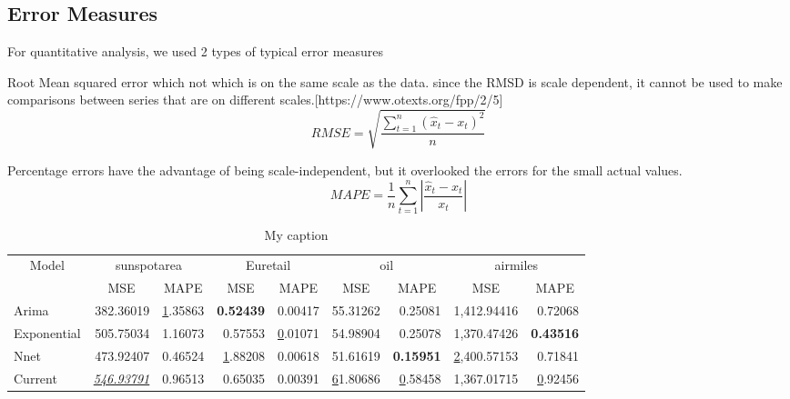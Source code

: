 
\subsection{Error Measures}

For quantitative analysis, we used 2 types of  typical error measures 

Root Mean squared error which  not which is on the same scale as the data. since the RMSD is scale dependent, it cannot be used to make comparisons between series that are on different scales.[https://www.otexts.org/fpp/2/5]
$$RMSE=\sqrt{\frac{\sum_{t=1}^{n}(\hat{x}_{t}-x_{t})^{2}}{n}}$$


Percentage errors have the advantage of being scale-independent, but it overlooked the errors for the small actual values.
$$ MAPE=\frac{1}{n}\sum_{t=1}^{n}\left | \frac{\hat{x}_{t}-x_{t}}{x_{t}} \right |$$

\usepackage{multirow}
\usepackage[normalem]{ulem}
\useunder{\uline}{\ul}{}

\begin{table}[]
\centering
\caption{My caption}
\label{my-label}
\begin{tabular}{|l|r|r|r|r|r|r|r|r|}
\hline
\multicolumn{1}{|c|}{\multirow{2}{*}{Model}} & \multicolumn{2}{c|}{sunspotarea}                     & \multicolumn{2}{c|}{Euretail}                        & \multicolumn{2}{c|}{oil}                             & \multicolumn{2}{c|}{airmiles}                        \\ \cline{2-9} 
\multicolumn{1}{|c|}{}                       & \multicolumn{1}{c|}{MSE} & \multicolumn{1}{c|}{MAPE} & \multicolumn{1}{c|}{MSE} & \multicolumn{1}{c|}{MAPE} & \multicolumn{1}{c|}{MSE} & \multicolumn{1}{c|}{MAPE} & \multicolumn{1}{c|}{MSE} & \multicolumn{1}{c|}{MAPE} \\ \hline
Arima                                        & 382.36019                & {\ul 1.35863}             & \textbf{0.52439}         & 0.00417                   & 55.31262                 & 0.25081                   & 1,412.94416              & 0.72068                   \\ \hline
Exponential                                  & 505.75034                & 1.16073                   & 0.57553                  & {\ul 0.01071}             & 54.98904                 & 0.25078                   & 1,370.47426              & \textbf{0.43516}          \\ \hline
Nnet                                         & 473.92407                & 0.46524                   & {\ul 1.88208}            & 0.00618                   & 51.61619                 & \textbf{0.15951}          & {\ul 2,400.57153}        & 0.71841                   \\ \hline
Current                                      & {\ul \textit{546.93791}} & 0.96513                   & 0.65035                  & 0.00391                   & {\ul 61.80686}           & {\ul 0.58458}             & 1,367.01715              & {\ul 0.92456}             \\ \hline
\end{tabular}
\end{table}


